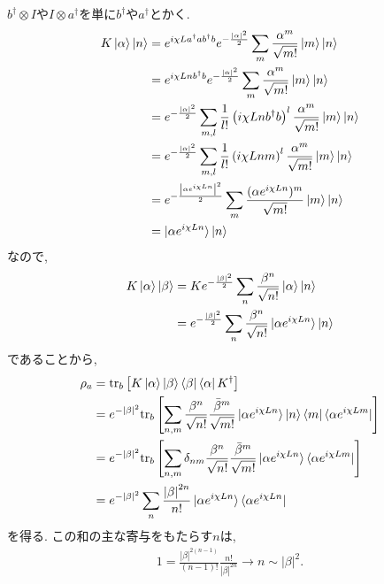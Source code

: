 \begin{ex}
    \label{ex7.13}

\end{ex}

\begin{ex}
    \label{ex7.14}
    $b^\dagger \otimes I$や$I \otimes a^\dagger$を単に$b^\dagger$や$a^\dagger$とかく.
    \begin{align*}
        K \ket{\alpha}\ket{n}
         & =
        e^{i \chi L a^\dagger a  b^\dagger b} e^{- \frac{|\alpha|^2}{2}} \sum_m \frac{\alpha^m}{\sqrt{m!}} \ket{m} \ket{n}
        \\
         & =
        e^{i \chi L n b^\dagger b} e^{- \frac{|\alpha|^2}{2}} \sum_m \frac{\alpha^m}{\sqrt{m!}} \ket{m} \ket{n}
        \\
         & =
        e^{- \frac{|\alpha|^2}{2}}
        \sum_{m,l} \frac{1}{l!} \left(i \chi L n b^\dagger b \right)^l
        \frac{\alpha^m}{\sqrt{m!}} \ket{m} \ket{n}
        \\
         & =
        e^{- \frac{|\alpha|^2}{2}}
        \sum_{m,l} \frac{1}{l!} \left(i \chi L n m \right)^l
        \frac{\alpha^m}{\sqrt{m!}} \ket{m} \ket{n}
        \\
         & =
        e^{- \frac{\left|\alpha e^{i \chi L n} \right|^2}{2}}
        \sum_{m}
        \frac{ ( \alpha e^{i \chi L n} )^m}{\sqrt{m!}} \ket{m} \ket{n}
        \\
         & =\ket{\alpha e^{i \chi L n}} \ket{n}
    \end{align*}
    なので,
    \begin{align*}
        K \ket{\alpha}\ket{\beta}
         & =
        K e^{-\frac{|\beta|^2}{2}} \sum_n \frac{\beta^n}{\sqrt{n!}} \ket{\alpha}\ket{n}
        \\
         & =
        e^{-\frac{|\beta|^2}{2}} \sum_n \frac{\beta^n}{\sqrt{n!}} \ket{\alpha e^{i\chi L n}}\ket{n}
    \end{align*}
    であることから,
    \begin{align*}
        \rho_a
         & =
        \mathrm{tr}_b \left[ K \ket{\alpha}\ket{\beta} \bra{\beta} \bra{\alpha} K^\dagger\right] \\
         & =
        e^{- |\beta|^2}
        \mathrm{tr}_b \left[
            \sum_{n,m}
            \frac{\beta^n}{\sqrt{n!}} \frac{\bar{\beta}^m}{\sqrt{m!}}
            \ket{\alpha e^{i\chi L n}}\ket{n} \bra{m} \bra{\alpha e^{i\chi L m}}
            \right]
        \\
         & =
        e^{- |\beta|^2}
        \mathrm{tr}_b \left[
            \sum_{n,m}
            \delta_{nm}
            \frac{\beta^n}{\sqrt{n!}} \frac{\bar{\beta}^m}{\sqrt{m!}}
            \ket{\alpha e^{i\chi L n}} \bra{\alpha e^{i\chi L m}}
            \right]
        \\
         & =
        e^{- |\beta|^2}
        \sum_{n}
        \frac{\left| \beta \right|^{2n}}{n!}
        \ket{\alpha e^{i\chi L n}} \bra{\alpha e^{i\chi L n}}
    \end{align*}
    を得る. この和の主な寄与をもたらす$n$は,
    \begin{align*}
        1 = \frac{|\beta|^{2(n-1)}}{(n-1)!} \frac{n!}{|\beta|^{2n}} \to n \sim |\beta|^2.
    \end{align*}
\end{ex}

